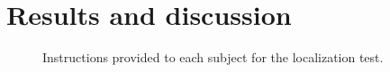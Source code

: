 \section{Results and discussion}\label{sec:05_Proposed_Models:Results}


\begin{figure}[t]
  \centering
  \setlength{\fboxsep}{0pt}
  \setlength{\fboxrule}{1pt}
  \caption{Instructions provided to each subject for the localization test.}
  \label{fig:05_Proposed_Models:Localization_Instructions}
\end{figure}

